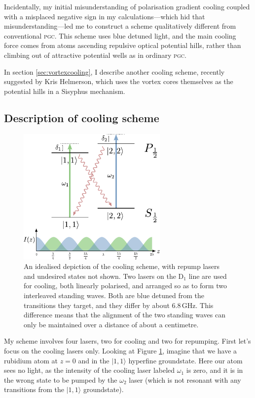Incidentally, my initial misunderstanding of polarisation gradient cooling coupled with a misplaced negative sign in my calculations---which hid that misunderstanding---led me to construct a scheme qualitatively different from conventional \textsc{pgc}. This scheme uses blue detuned light, and the main cooling force comes from atoms ascending repulsive optical potential hills, rather than climbing out of attractive potential wells as in ordinary \textsc{pgc}.

In section \ref{sec:vortexcooling}, I describe another cooling scheme, recently suggested by Kris Helmerson, which uses the vortex cores themselves as the potential hills in a Sisyphus mechanism.

\subsection{Description of cooling scheme}

\begin{figure}
\begin{center}
\includegraphics[width=0.65\textwidth]{figures/unsorted/cooling_simplified.pdf}
\caption{\label{fig:cooling_simplified}An idealised depiction of the cooling scheme, with repump lasers and undesired states not shown. Two lasers on the D$_1$ line are used for cooling, both linearly polarised, and arranged so as to form two interleaved standing waves. Both are blue detuned from the transitions they target, and they differ by about $6.8\,$GHz. This difference means that the alignment of the two standing waves can only be maintained over a distance of about a centimetre.}
\end{center}
\end{figure}

My scheme involves four lasers, two for cooling and two for repumping. First let's focus on the cooling lasers only. Looking at Figure \ref{fig:cooling_simplified}, imagine that we have a rubidium atom at $z=0$ and in the $|1,1\rangle$ hyperfine groundstate. Here our atom sees no light, as the intensity of the cooling laser labeled $\omega_1$ is zero, and it is in the wrong state to be pumped by the $\omega_2$ laser (which is not resonant with any transitions from the $|1,1\rangle$ groundstate).

